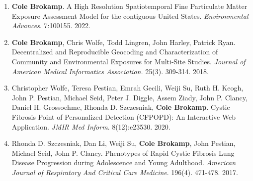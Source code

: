 \documentclass{nihbiosketch}
\begin{document}
\begin{statement}
\begin{enumerate}




  \item \textbf{Cole Brokamp}. A High Resolution Spatiotemporal Fine Particulate Matter Exposure Assessment Model for the contiguous United States. \textit{Environmental Advances}. 7:100155. 2022.

  \item \textbf{Cole Brokamp}, Chris Wolfe, Todd Lingren, John Harley, Patrick Ryan. Decentralized and Reproducible Geocoding and Characterization of Community and Environmental Exposures for Multi-Site Studies. \textit{Journal of American Medical Informatics Association.} 25(3). 309-314. 2018.

  \item Christopher Wolfe, Teresa Pestian, Emrah Gecili, Weiji Su, Ruth H. Keogh, John P. Pestian, Michael Seid, Peter J. Diggle, Assem Ziady, John P. Clancy, Daniel H. Grossoehme, Rhonda D. Szczesniak, \textbf{Cole Brokamp}. Cystic Fibrosis Point of Personalized Detection (CFPOPD): An Interactive Web Application. \emph{JMIR Med Inform}. 8(12):e23530. 2020.

  \item Rhonda D. Szczesniak, Dan Li, Weiji Su, \textbf{Cole Brokamp}, John Pestian, Michael Seid, John P. Clancy. Phenotypes of Rapid Cystic Fibrosis Lung Disease Progression during Adolescence and Young Adulthood. \textit{American Journal of Respiratory And Critical Care Medicine}. 196(4). 471-478. 2017.

\end{enumerate}

\end{statement}
\end{document}
